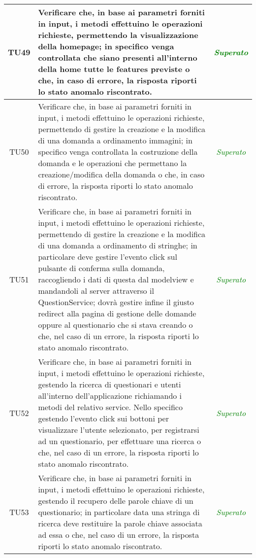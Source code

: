 \begin{longtable}{|c|>{}m{10cm}|c|}
\hypertarget{TU49}{TU49} & Verificare che, in base ai parametri forniti in input, i metodi effettuino le operazioni richieste, permettendo la visualizzazione della homepage; in specifico venga controllata che siano presenti all'interno della home tutte le features previste o che, in caso di errore, la risposta riporti lo stato anomalo riscontrato. & \textcolor{Green}{\textit{Superato}}\\ \hline
\hypertarget{TU50}{TU50} & Verificare che, in base ai parametri forniti in input, i metodi effettuino le operazioni richieste, permettendo di gestire la creazione e la modifica di una domanda a ordinamento immagini; in specifico venga controllata la costruzione della domanda e le operazioni che permettano la creazione/modifica della domanda o che, in caso di errore, la risposta riporti lo stato anomalo riscontrato. & \textcolor{Green}{\textit{Superato}}\\ \hline
\hypertarget{TU51}{TU51} & Verificare che, in base ai parametri forniti in input, i metodi effettuino le operazioni richieste, permettendo di gestire la creazione e la modifica di una domanda a ordinamento di stringhe; in particolare deve gestire l'evento click sul pulsante di conferma sulla domanda, raccogliendo i dati di questa dal modelview e mandandoli al server attraverso il QuestionService; dovrà gestire infine il giusto redirect alla pagina di gestione delle domande oppure al questionario che si stava creando o che, nel caso di un errore, la risposta riporti lo stato anomalo riscontrato. & \textcolor{Green}{\textit{Superato}}\\ \hline
\hypertarget{TU52}{TU52} & Verificare che, in base ai parametri forniti in input, i metodi effettuino le operazioni richieste, gestendo la ricerca di questionari e utenti all'interno dell'applicazione richiamando i metodi del relativo service. Nello specifico gestendo l'evento click sui bottoni per visualizzare l'utente selezionato, per registrarsi ad un questionario, per effettuare una ricerca  o che, nel caso di un errore, la risposta riporti lo stato anomalo riscontrato. & \textcolor{Green}{\textit{Superato}}\\ \hline
\hypertarget{TU53}{TU53} & Verificare che, in base ai parametri forniti in input, i metodi effettuino le operazioni richieste, gestendo il recupero delle parole chiave di un questionario; in particolare data una stringa di ricerca deve restituire la parole chiave associata ad essa o che, nel caso di un errore, la risposta riporti lo stato anomalo riscontrato. & \textcolor{Green}{\textit{Superato}}\\ \hline

\end{longtable}
